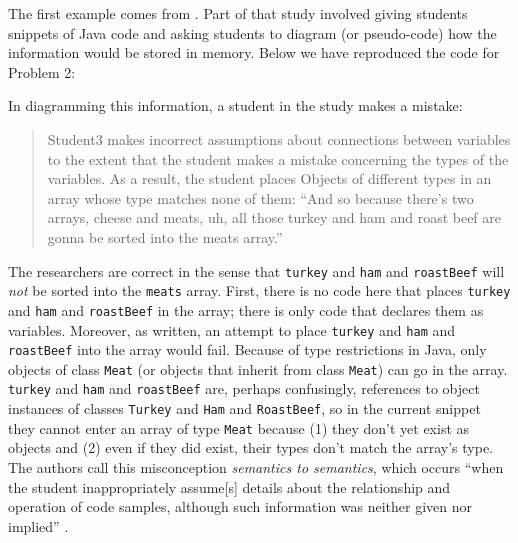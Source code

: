 The first example comes from \cite{kaczmarczyk_identifying_2010}. Part of that
study involved giving students snippets of Java code and asking students
to diagram (or pseudo-code) how the information would be stored in
memory. Below we have reproduced the code for Problem 2:

\hypertarget{sandiwches-code}{\label{sandwiches-code}}
\begin{Shaded}
\begin{Highlighting}[numbers=left,,]
 \NormalTok{Cheese[}\NormalTok{];}
 \NormalTok{Meat[}\NormalTok{];}
 \NormalTok{;}
 \NormalTok{;}
 \NormalTok{();}
 
 
\end{Highlighting}
\end{Shaded}

In diagramming this information, a student in the study makes a mistake:

\begin{quote}
  Student3 makes incorrect assumptions about connections between variables
  to the extent that the student makes a mistake concerning the types of
  the variables. As a result, the student places Objects of different
  types in an array whose type matches none of them: ``And so because
  there's two arrays, cheese and meats, uh, all those turkey and ham and
  roast beef are gonna be sorted into the meats array.'' \cite{kaczmarczyk_identifying_2010}
\end{quote}

The researchers are correct in the sense that \texttt{turkey} and
\texttt{ham} and \texttt{roastBeef} will \emph{not} be sorted into the
\texttt{meats} array. First, there is no code here that places
\texttt{turkey} and \texttt{ham} and \texttt{roastBeef} in the array;
there is only code that
declares them as variables. Moreover, as written, an attempt to place
\texttt{turkey} and \texttt{ham} and \texttt{roastBeef} into the array
would fail. Because of type restrictions in Java, only objects of class
\texttt{Meat} (or objects that inherit from class \texttt{Meat}) can go in the array.
\texttt{turkey} and \texttt{ham} and \texttt{roastBeef} are, perhaps
confusingly, references to object instances of classes \texttt{Turkey}
and \texttt{Ham} and \texttt{RoastBeef}, so in the current snippet they
cannot enter an array of type \texttt{Meat} because (1) they don't yet
exist as objects and (2) even if they did exist, their types don't match
the array's type. The authors call this misconception \emph{semantics to
semantics}, which occurs ``when the student inappropriately
assume{[}s{]} details about the relationship and operation of code
samples, although such information was neither given nor implied''
\cite{kaczmarczyk_identifying_2010}.

